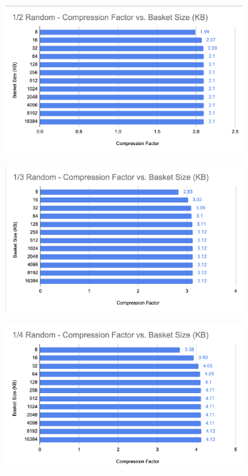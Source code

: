\begin{figure}[h]
    \centering
    \begin{subfigure}{.5\textwidth}
        \centering
        \includegraphics[width=\textwidth]{content/toymodel_content/3.28/1_of_2.png}
        \label{fig:toymodel_328_compF_vs_basketsize_subA}
      \end{subfigure}%
      \begin{subfigure}{.5\textwidth}
        \centering
        \includegraphics[width=\textwidth]{content/toymodel_content/3.28/1_of_3.png}
        \label{fig:toymodel_328_compF_vs_basketsize_subB}
      \end{subfigure}%
      \linebreak
      \begin{subfigure}{.5\textwidth}
        \centering
        \includegraphics[width=\textwidth]{content/toymodel_content/3.28/1_of_4.png}

\end{subfigure}
\end{figure}
